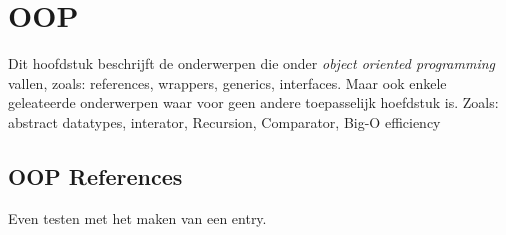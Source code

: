 \section{OOP}
Dit hoofdstuk beschrijft de onderwerpen die onder \textit{object oriented programming} vallen, zoals: references, wrappers, generics, interfaces.
Maar ook enkele geleateerde onderwerpen waar voor geen andere toepasselijk hoefdstuk is. Zoals: abstract datatypes, interator, Recursion, Comparator, Big-O efficiency

\subsection{OOP References}
Even testen  met het maken van een entry.
